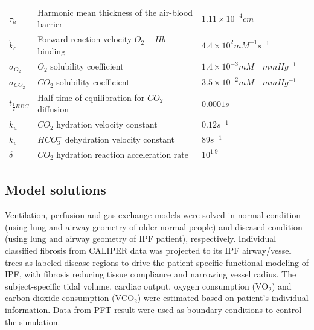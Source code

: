 \begin{landscape}
\begin{table}[htbp]
\begin{tabular}{p{2.2cm} p{7.5cm} p{5.2cm} p{4.8cm}}
$\tau_h$ & Harmonic mean thickness of the air-blood barrier & $1.11 \times 10^{-4}cm$ & \cite{weibel1993morphometric} \\
$\acute{k}_c$ & Forward reaction velocity $O_2-Hb$ binding & $4.4 \times 10^{2}mM^{-1}s^{-1}$ & \cite{weibel1997design} \\
$\sigma_{O_2}$ & $O_2$ solubility coefficient & $1.4 \times 10^{-3}mM \quad mmHg^{-1}$ & \cite{keener1998mathematical} \\
$\sigma_{CO_2}$ & $CO_2$ solubility coefficient & $3.5 \times 10^{-2}mM \quad mmHg^{-1}$ & \cite{keener1998mathematical} \\
$t_{\frac{1}{2}RBC}$ & Half-time of equilibration for $CO_2$ diffusion & $0.0001 s$ & \cite{hill1973mathematical} \\
$k_u$ & $CO_2$ hydration velocity constant & $0.12s^{-1}$ & \cite{hill1973mathematical} \\
$k_v$ & $HCO^{-}_3$ dehydration velocity constant & $89s^{-1}$ & \cite{hill1973mathematical} \\
$\delta$ & $CO_2$ hydration reaction acceleration rate & $10^{1.9}$ & \cite{ben2006simplified} \\
\hline
\end{tabular}
\end{table}
\end{landscape}
\restoregeometry

\subsection{Model solutions}
Ventilation, perfusion and gas exchange models were solved in normal condition (using lung and airway geometry of older normal people) and diseased condition (using lung and airway geometry of IPF patient), respectively. Individual classified fibrosis from CALIPER data was projected to its IPF airway/vessel trees as labeled disease regions to drive the patient-specific functional modeling of IPF, with fibrosis reducing tissue compliance and narrowing vessel radius. The subject-specific tidal volume, cardiac output, oxygen consumption ($\mathrm{VO_2}$) and carbon dioxide consumption ($\mathrm{VCO_2}$) were estimated based on patient's individual information. Data from PFT result were used as boundary conditions to control the simulation.

